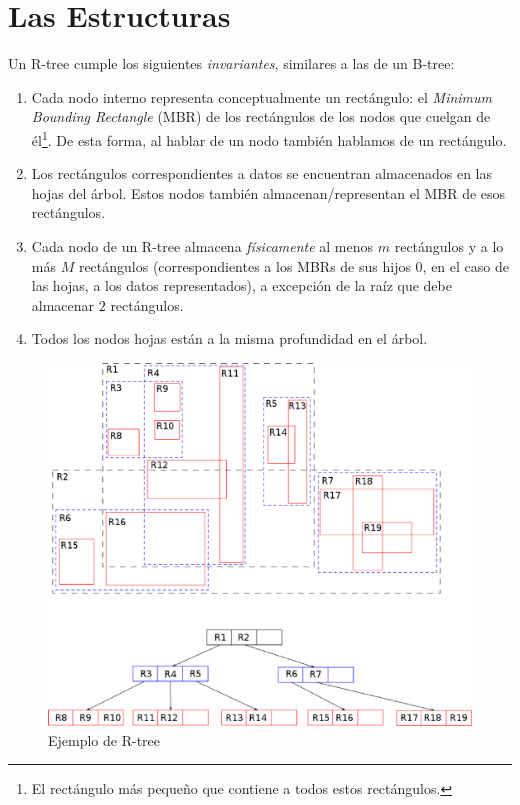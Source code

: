 \documentclass[dcc,uchile]{fcfmcourse}
\begin{document}
\section{Las Estructuras}
Un R-tree cumple los siguientes \textit{invariantes}, similares a las de un B-tree:
\begin{enumerate}[1.]
    \item Cada nodo interno representa conceptualmente un rectángulo: el \textit{Minimum Bounding Rectangle} (MBR) de los rectángulos de los nodos que cuelgan de él\footnote{El rectángulo más pequeño que contiene a todos estos rectángulos.}. De esta forma, al hablar de un nodo también hablamos de un rectángulo.
    \item Los rectángulos correspondientes a datos se encuentran almacenados en las hojas del árbol. Estos nodos también almacenan/representan el MBR de esos rectángulos.
    \item Cada nodo de un R-tree almacena \textit{físicamente} al menos $m$ rectángulos y a lo más $M$ rectángulos (correspondientes a los MBRs de sus hijos 0, en el caso de las hojas, a los datos representados), a excepción de la raíz que debe almacenar $2$ rectángulos.
    \item Todos los nodos hojas están a la misma profundidad en el árbol.
\end{enumerate}
\begin{figure}[h]
    \centering
    \includegraphics[scale=0.5]{imagenes/R-tree}
    \caption{Ejemplo de R-tree}
    \label{fig:my_label}
\end{figure}
\end{document}
